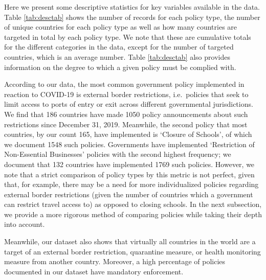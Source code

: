 \documentclass[
]{article}
\begin{document}
Here we present some descriptive statistics for key variables available in the data. Table \ref{tab:desctab} shows the number of records for each policy type, the number of unique countries for each policy type as well as how many countries are targeted in total by each policy type. We note that these are cumulative totals for the different categories in the data, except for the number of targeted countries, which is an average number. Table \ref{tab:desctab} also provides information on the degree to which a given policy must be complied with.

According to our data, the most common government policy implemented in reaction to COVID-19 is external border restrictions, i.e.~policies that seek to limit access to ports of entry or exit across different governmental jurisdictions. We find that 186 countries have made 1050 policy announcements about such restrictions since December 31, 2019. Meanwhile, the second policy that most countries, by our count 165, have implemented is `Closure of Schools', of which we document 1548 such policies. Governments have implemented `Restriction of Non-Essential Businesses' policies with the second highest frequency; we document that 132 countries have implemented 1769 such policies. However, we note that a strict comparison of policy types by this metric is not perfect, given that, for example, there may be a need for more individualized policies regarding external border restrictions (given the number of countries which a government can restrict travel access to) as opposed to closing schools. In the next subsection, we provide a more rigorous method of comparing policies while taking their depth into account.

Meanwhile, our dataset also shows that virtually all countries in the world are a target of an external border restriction, quarantine measure, or health monitoring measure from another country. Moreover, a high percentage of policies documented in our dataset have mandatory enforcement.
\end{document}
